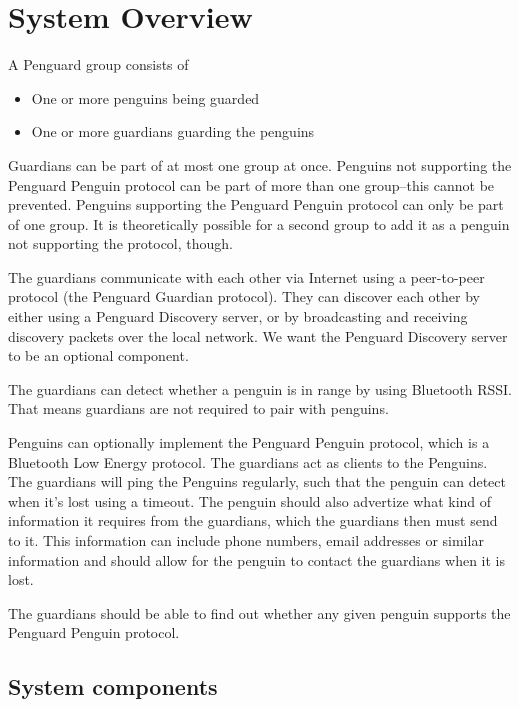 \documentclass{report}
\begin{document}
\section{System Overview}

A Penguard group consists of

\begin{itemize}
    \item One or more penguins being guarded
    \item One or more guardians guarding the penguins
\end{itemize}

Guardians can be part of at most one group at once. Penguins not supporting the Penguard Penguin protocol can be part of more than one group--this cannot be prevented. Penguins supporting the Penguard Penguin protocol can only be part of one group. It is theoretically possible for a second group to add it as a penguin not supporting the protocol, though.

The guardians communicate with each other via Internet using a peer-to-peer protocol (the Penguard Guardian protocol). They can discover each other by either using a Penguard Discovery server, or by broadcasting and receiving discovery packets over the local network. We want the Penguard Discovery server to be an optional component.

The guardians can detect whether a penguin is in range by using Bluetooth RSSI. That means guardians are not required to pair with penguins. 

Penguins can optionally implement the Penguard Penguin protocol, which is a Bluetooth Low Energy protocol. The guardians act as clients to the Penguins. The guardians will ping the Penguins regularly, such that the penguin can detect when it's lost using a timeout. The penguin should also advertize what kind of information it requires from the guardians, which the guardians then must send to it. This information can include phone numbers, email addresses or similar information and should allow for the penguin to contact the guardians when it is lost.

The guardians should be able to find out whether any given penguin supports the Penguard Penguin protocol.

\subsection{System components}
\end{document}
